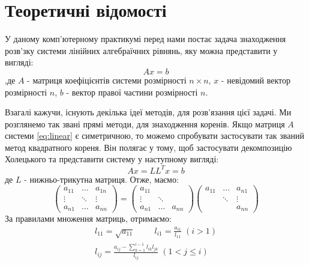 \section*{\centering Теоретичні відомості}
У даному комп'ютерному практикумі перед нами
постає задача знаходження розв'зку системи лінійних
алгебраїчних рівнянь, яку можна представити у вигляді:
\begin{equation} \label{eq:linear}
    Ax = b
\end{equation}
,де $A$ - матриця коефіцієнтів системи розмірності $n \times n$,
$x$ - невідомий вектор розмірності $n$,
$b$ - вектор правої частини розмірності $n$.

\noindent
Взагалі кажучи, існують декілька ідеї методів, для розв'язання
цієї задачі. Ми розглянемо так звані прямі методи, для знаходження
коренів. Якщо матриця $A$ системи \ref{eq:linear} є симетричною, то
можемо спробувати застосувати так званий метод квадратного кореня.
Він полягає у тому, щоб застосувати декомпозицію Холецького та представити
систему у наступному вигляді:
\begin{equation}
    Ax = LL^Tx=b
\end{equation}
де $L$ - нижньо-трикутна матриця. Отже, маємо:
\[
    \begin{pmatrix}
        a_{11} & \dots & a_{1n} \\
        \vdots & \ddots & \vdots \\
        a_{n1} & \dots  & a_{nn}
    \end{pmatrix} =
    \begin{pmatrix}
        a_{11} & &  \\
        \vdots & \ddots &  \\
        a_{n1} & \dots  & a_{nn}
    \end{pmatrix}
    \begin{pmatrix}
        a_{11} & \dots & a_{n1} \\
        & \ddots & \vdots \\
        & & a_{nn}
    \end{pmatrix}
\]
За правилами множення матриць, отримаємо:
\begin{equation} \label{alg:cholesky}
    \begin{gathered}
        l_{11} = \sqrt{a_{11}} \hspace{1cm}
        l_{i1} = \frac{a_{i1}}{l_{11}} \; (i > 1) \\
        l_{ij} = \frac{a_{ij} - \sum \limits_{k=1}^{i-1} l_{ik} l_{jk}}{l_{ij}} \; (1 < j \leq i)
    \end{gathered}
\end{equation}

